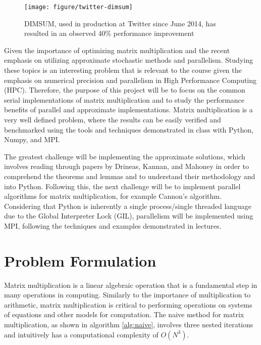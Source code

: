 \documentclass[oneside]{article}
\begin{document}
\begin{figure}[ht!]
\centering
\texttt{[image: figure/twitter-dimsum]}
\caption{DIMSUM, used in production at Twitter since June 2014, has resulted in an observed 40\% performance improvement\cite{zadeh2013dimension}}
\label{fig:transaction}
\end{figure}


Given the importance of optimizing matrix multiplication and the recent emphasis on utilizing approximate stochastic methods and parallelism. Studying these topics is an interesting problem that is relevant to the course given the emphasis on numerical precision and parallelism in High Performance Computing (HPC). Therefore, the purpose of this project will be to focus on the common serial implementations of matrix multiplication and to study the performance benefits of parallel and approximate implementations. Matrix multiplication is a very well defined problem, where the results can be easily verified and benchmarked using the tools and techniques demonstrated in class with Python, Numpy, and MPI\cite{van2011numpy}.

The greatest challenge will be implementing the approximate solutions, which involves reading through papers by Drineas, Kannan, and Mahoney in order to comprehend the theorems and lemmas and to understand their methodology and into Python. Following this, the next challenge will be to implement parallel algorithms for matrix multiplication, for example Cannon's algorithm. Considering that Python is inherently a single process/single threaded language due to the Global Interpreter Lock (GIL)\cite{beazley2010understanding}, parallelism will be implemented using MPI, following the techniques and examples demonstrated in lectures.




\section{Problem Formulation}

Matrix multiplication is a linear algebraic operation that is a fundamental step in many operations in computing. Similarly to the importance of multiplication to arithmetic, matrix multiplication is critical to performing operations on systems of equations and other models for computation. The naive method for matrix multiplication, as shown in algorithm \ref{alg:naive}, involves three nested iterations and intuitively has a computational complexity of $O(N^{3})$.
\end{document}
